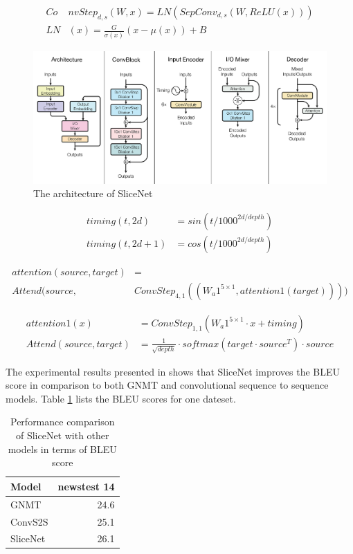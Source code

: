\documentclass[a4paper]{article}
\begin{document}
\begin{align*}
  Co&nvStep_{d,s}(W, x) = LN(SepConv_{d,s}(W, ReLU(x))) \\
  LN&(x) = \frac{G}{\sigma(x)}(x - \mu(x)) + B
\end{align*}


\begin{figure}
  \center
  \includegraphics[width=\textwidth]{img/SN}
  \caption{The architecture of SliceNet}
  \label{fig:sn}
\end{figure}


\begin{align*}
  timing(t, 2d) &= sin(t/1000^{2d/depth}) \\
  timing(t, 2d + 1) &= cos(t/1000^{2d/depth})
\end{align*}


\begin{align*}
  attention(source, target) &= \\
  Attend(source, &ConvStep_{4,1}((W_a1^{5 \times 1}, attention1(target))))
\end{align*}


\begin{align*}
  attention1(x) &= ConvStep_{1,1}(W_a1^{5 \times 1} \cdot x + timing) \\
  Attend(source, target) &= \frac{1}{\sqrt{depth}} \cdot
    softmax(target \cdot source^T) \cdot source
\end{align*}


The experimental results presented in \cite{DBLP:journals/corr/KaiserGC17} shows
that  SliceNet  improves  the  BLEU  score  in  comparison  to  both   GNMT  and
convolutional sequence to sequence models. Table \ref{tab:snbleu} lists the BLEU
scores for one dateset.


\begin{table}
  \center
  \begin{tabular}{lr}
  \hline
    Model & newstest 14 \\
  \hline
    GNMT & 24.6 \\
    ConvS2S & 25.1 \\
    SliceNet & 26.1 \\
  \hline
  \end{tabular}
  \caption{Performance comparison of SliceNet with other models in terms of BLEU
  score}
  \label{tab:snbleu}
\end{table}




\end{document}

